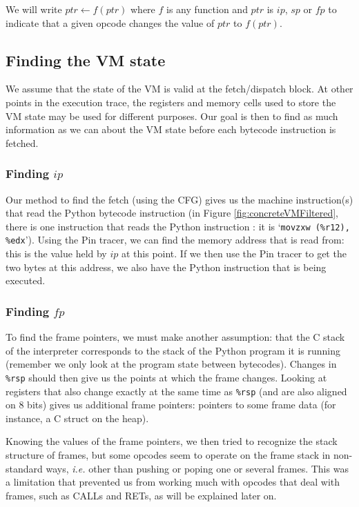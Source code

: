 \documentclass[english]{article}
\begin{document}
We will write $ptr \leftarrow f(ptr)$ where $f$ is any function and $ptr$ is $ip$, $sp$ or $fp$ to indicate that a given opcode changes the value of $ptr$ to $f(ptr)$.

\subsection{Finding the VM state}

We assume that the state of the VM is valid at the fetch/dispatch block. At other points in the execution trace, the registers and memory cells used to store the VM state may be used for different purposes. Our goal is then to find as much information as we can about the VM state before each bytecode instruction is fetched.

\subsubsection{Finding $ip$}

Our method to find the fetch (using the CFG) gives us the machine instruction(s) that read the Python bytecode instruction (in Figure \ref{fig:concreteVMFiltered}, there is one instruction that reads the Python instruction : it is `\texttt{movzxw (\%r12), \%edx}'). Using the Pin tracer, we can find the memory address that is read from: this is the value held by $ip$ at this point. If we then use the Pin tracer to get the two bytes at this address, we also have the Python instruction that is being executed.

\subsubsection{Finding $fp$}

To find the frame pointers, we must make another assumption: that the C stack of the interpreter corresponds to the stack of the Python program it is running (remember we only look at the program state between bytecodes). Changes in \texttt{\%rsp} should then give us the points at which the frame changes. Looking at registers that also change exactly at the same time as \texttt{\%rsp} (and are also aligned on 8 bits) gives us additional frame pointers: pointers to some frame data (for instance, a C struct on the heap).

Knowing the values of the frame pointers, we then tried to recognize the stack structure of frames, but some opcodes seem to operate on the frame stack in non-standard ways, \textit{i.e.} other than pushing or poping one or several frames. This was a limitation that prevented us from working much with opcodes that deal with frames, such as CALLs and RETs, as will be explained later on.
\end{document}
